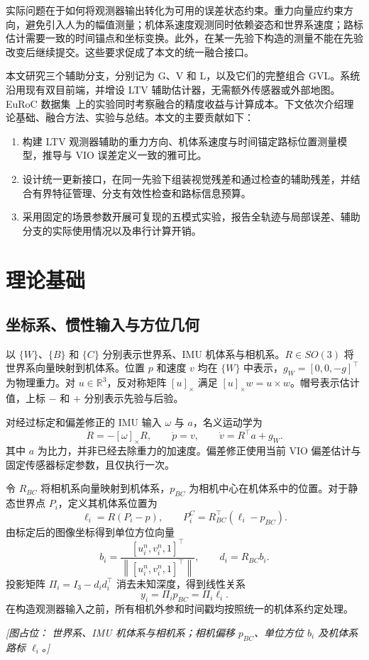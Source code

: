 \documentclass[a4paper,runningheads]{llncs}
\newcommand{\R}{\mathbb{R}}
\newcommand{\sk}[1]{[#1]_{\times}}
\newcommand{\norm}[1]{\left\lVert #1\right\rVert}
\newcommand{\placeholder}[1]{\par\smallskip\noindent\textit{[图占位： #1]}\par\smallskip}
\begin{document}
实际问题在于如何将观测器输出转化为可用的误差状态约束。重力向量应约束方向，避免引入人为的幅值测量；机体系速度观测同时依赖姿态和世界系速度；路标估计需要一致的时间锚点和坐标变换。此外，在某一先验下构造的测量不能在先验改变后继续提交。这些要求促成了本文的统一融合接口。

本文研究三个辅助分支，分别记为 G、V 和 L，以及它们的完整组合 GVL。系统沿用现有双目前端，并增设 LTV 辅助估计器，无需额外传感器或外部地图。EuRoC 数据集~\cite{burri2016}上的实验同时考察融合的精度收益与计算成本。下文依次介绍理论基础、融合方法、实验与总结。本文的主要贡献如下：
\begin{enumerate}
\item 构建 LTV 观测器辅助的重力方向、机体系速度与时间锚定路标位置测量模型，推导与 VIO 误差定义一致的雅可比。
\item 设计统一更新接口，在同一先验下组装视觉残差和通过检查的辅助残差，并结合有界特征管理、分支有效性检查和路标信息预算。
\item 采用固定的场景参数开展可复现的五模式实验，报告全轨迹与局部误差、辅助分支的实际使用情况以及串行计算开销。
\end{enumerate}

\section{理论基础}
\subsection{坐标系、惯性输入与方位几何}
以 $\{W\}$、$\{B\}$ 和 $\{C\}$ 分别表示世界系、IMU 机体系与相机系。$R\in SO(3)$ 将世界系向量映射到机体系。位置 $p$ 和速度 $v$ 均在 $\{W\}$ 中表示，$g_W=[0,0,-g]^\top$ 为物理重力。对 $u\in\R^3$，反对称矩阵 $\sk{u}$ 满足 $\sk{u}w=u\times w$。帽号表示估计值，上标 $-$ 和 $+$ 分别表示先验与后验。

对经过标定和偏差修正的 IMU 输入 $\omega$ 与 $a$，名义运动学为
\begin{equation}
 \dot R=-\sk{\omega}R,\qquad
 \dot p=v,\qquad
 \dot v=R^\top a+g_W .
 \label{eq:kinematics}
\end{equation}
其中 $a$ 为比力，并非已经去除重力的加速度。偏差修正使用当前 VIO 偏差估计与固定传感器标定参数，且仅执行一次。

令 $R_{BC}$ 将相机系向量映射到机体系，$p_{BC}$ 为相机中心在机体系中的位置。对于静态世界点 $P_i$，定义其机体系位置为
\begin{equation}
 \ell_i=R(P_i-p),\qquad
 P_i^C=R_{BC}^{\top}(\ell_i-p_{BC}).
 \label{eq:pointframes}
\end{equation}
由标定后的图像坐标得到单位方位向量
\begin{equation}
 b_i=\frac{[u_i^{n},v_i^{n},1]^\top}
 {\norm{[u_i^{n},v_i^{n},1]^\top}},\qquad d_i=R_{BC}b_i .
\end{equation}
投影矩阵 $\Pi_i=I_3-d_id_i^\top$ 消去未知深度，得到线性关系
\begin{equation}
 y_i=\Pi_i p_{BC}=\Pi_i\ell_i .
 \label{eq:bearing}
\end{equation}
在构造观测器输入之前，所有相机外参和时间戳均按照统一的机体系约定处理。
\placeholder{世界系、IMU 机体系与相机系；相机偏移 $p_{BC}$、单位方位 $b_i$ 及机体系路标 $\ell_i$。}
\end{document}
